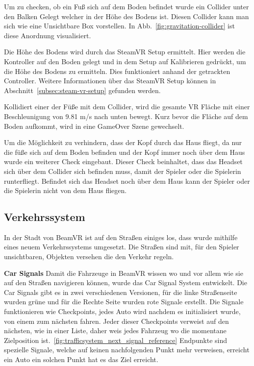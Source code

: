 Um zu checken, ob ein Fuß sich auf dem Boden befindet wurde ein Collider unter den Balken Gelegt welcher in der Höhe des Bodens ist.
Diesen Collider kann man sich wie eine Unsichtbare Box vorstellen.
In Abb.~\ref{fig:gravitation-collider} ist diese Anordnung visualisiert.

Die Höhe des Bodens wird durch das SteamVR Setup ermittelt.
Hier werden die Kontroller auf den Boden gelegt und in dem Setup auf Kalibrieren gedrückt, um die Höhe des Bodens zu ermitteln.
Dies funktioniert anhand der getrackten Controller.
Weitere Informationen über das SteamVR Setup können in Abschnitt~\ref{subsec:steam-vr-setup} gefunden werden.

Kollidiert einer der Füße mit dem Collider, wird die gesamte VR Fläche mit einer Beschleunigung von 9.81 m/s nach unten bewegt.
Kurz bevor die Fläche auf dem Boden aufkommt, wird in eine GameOver Szene gewechselt.

Um die Möglichkeit zu verhindern, dass der Kopf durch das Haus fliegt, da nur die füße sich auf dem Boden befinden und der Kopf immer noch über dem Haus wurde ein weiterer Check eingebaut.
Dieser Check beinhaltet, dass das Headset sich über dem Collider sich befinden muss, damit der Spieler oder die Spielerin runterfliegt.
Befindet sich das Headset noch über dem Haus kann der Spieler oder die Spielerin nicht von dem Haus fliegen.


\subsection{Verkehrssystem}
\label{subsec:traffic-system}
In der Stadt von BeamVR ist auf den Straßen einiges los, dass wurde mithilfe eines neuem Verkehrssystems umgesetzt.
Die Straßen sind mit, f\"ur den Spieler unsichtbaren, Objekten versehen die den Verkehr regeln.

\textbf{Car Signals}
Damit die Fahrzeuge in BeamVR wissen wo und vor allem wie sie auf den Straßen navigieren k\"onnen, wurde das Car Signal System entwickelt.
Die Car Signals gibt es in zwei verschiedenen Versionen, f\"ur die linke Straßenseite wurden gr\"une und f\"ur die Rechte Seite wurden rote Signale erstellt.
Die Signale funktionieren wie Checkpoints, jedes Auto wird nachdem es initialisiert wurde, von einem zum n\"achsten fahren.
Jeder dieser Checkpoints verweist auf den nächsten, wie in einer Liste, daher weis jedes Fahrzeug wo die momentane Zielposition ist.~\ref{fig:trafficsystem_next_signal_reference}
Endpunkte sind spezielle Signale, welche auf keinen nachfolgenden Punkt mehr verweisen, erreicht ein Auto ein solchen Punkt hat es das Ziel erreicht.

